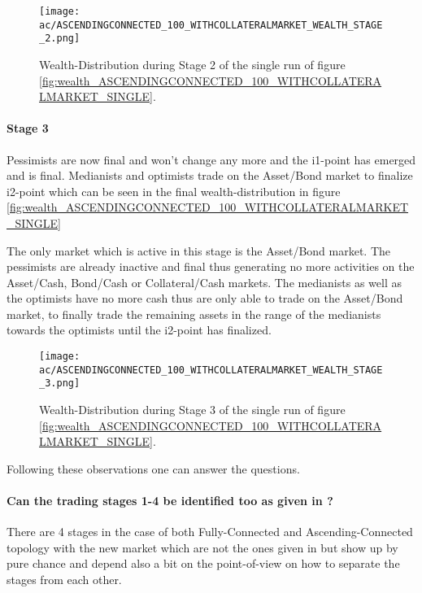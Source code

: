 \documentclass[Bachelorarbeit.tex]{subfiles}
\begin{document}
\begin{figure}[H]
	\centering
  \texttt{[image: ac/ASCENDINGCONNECTED\_100\_WITHCOLLATERALMARKET\_WEALTH\_STAGE\_2.png]}
  	\caption{Wealth-Distribution during Stage 2 of the single run of figure \ref{fig:wealth_ASCENDINGCONNECTED_100_WITHCOLLATERALMARKET_SINGLE}.}
	\label{fig:wealth_ASCENDINGCONNECTED_100_WITHCOLLATERALMARKET_WEALTH_STAGE_2}
\end{figure}

\paragraph{Stage 3}
Pessimists are now final and won't change any more and the i1-point has emerged and is final. Medianists and optimists trade on the Asset/Bond market to finalize i2-point which can be seen in the final wealth-distribution in figure \ref{fig:wealth_ASCENDINGCONNECTED_100_WITHCOLLATERALMARKET_SINGLE}

\medskip
The only market which is active in this stage is the Asset/Bond market. The pessimists are already inactive and final thus generating no more activities on the Asset/Cash, Bond/Cash or Collateral/Cash markets. The medianists as well as the optimists have no more cash thus are only able to trade on the Asset/Bond market, to finally trade the remaining assets in the range of the medianists towards the optimists until the i2-point has finalized.

\begin{figure}[H]
	\centering
  \texttt{[image: ac/ASCENDINGCONNECTED\_100\_WITHCOLLATERALMARKET\_WEALTH\_STAGE\_3.png]}
  	\caption{Wealth-Distribution during Stage 3 of the single run of figure \ref{fig:wealth_ASCENDINGCONNECTED_100_WITHCOLLATERALMARKET_SINGLE}.}
	\label{fig:wealth_ASCENDINGCONNECTED_100_WITHCOLLATERALMARKET_WEALTH_STAGE_3}
\end{figure}

Following these observations one can answer the questions.

\paragraph{Can the trading stages 1-4 be identified too as given in \cite{Breuer2015}?}
There are 4 stages in the case of both Fully-Connected and Ascending-Connected topology with the new market which are not the ones given in \cite{Breuer2015} but show up by pure chance and depend also a bit on the point-of-view on how to separate the stages from each other. 
\end{document}
